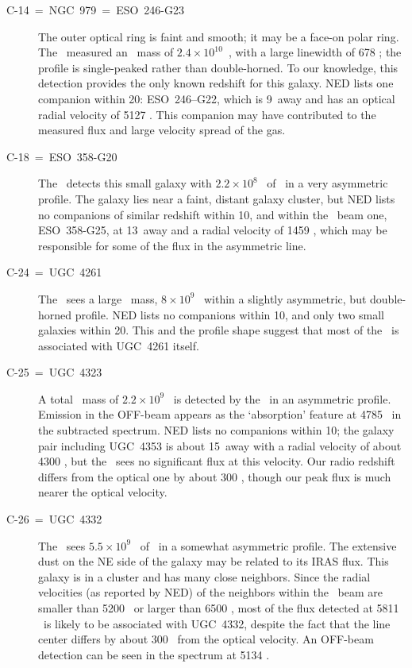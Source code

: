 \begin{description}
\item[C-14~=~NGC~979~=~ESO~246-G23] 
The outer optical ring is faint and smooth; it may be 
a face-on polar ring.  The \ measured 
an \HI\ mass of \hbox{$2.4 \times 10^{10}$ \MSUN}, with a large linewidth of 
678 \KMS; the profile is single-peaked rather than double-horned.  
To our knowledge, this detection provides the only known 
redshift for this galaxy.  
NED lists one companion within 20\AMIN: ESO~246--G22, which is 
9\AMIN\ away and has an optical radial velocity of 5127 \KMS.  This 
companion may have contributed to the measured flux and large velocity 
spread of the gas.

\item[C-18~=~ESO~358-G20] 
The \ detects this small galaxy with $2.2 \times 10^8$ \MSUN\ 
of \HI\ in a very asymmetric profile.  
The galaxy lies near a 
faint, distant galaxy cluster, but NED lists no companions 
of similar redshift within 10\AMIN, and within the \ beam one, 
ESO~358-G25, at 13\AMIN\ away and a radial velocity of 1459 \KMS, which may 
be responsible for some of the flux in the asymmetric line.  

\item[C-24~=~UGC~4261] 
The \ sees a large \HI\ mass, $8\times 10^9$
\MSUN\ within a slightly asymmetric, but double-horned profile.  
NED lists no companions within 10\AMIN, and only two small 
galaxies within 20\AMIN.  This and the profile shape  
suggest that most of the \HI\ is associated with UGC~4261 itself.  

\item[C-25~=~UGC~4323] 
A total \HI\ mass of $2.2 \times 10^9$ \MSUN\ is detected by the \ 
in an asymmetric profile.    
Emission in the OFF-beam appears as the `absorption' feature at 4785 \KMS\ 
in the subtracted spectrum.  
NED lists no companions within 10\AMIN; the galaxy pair 
including UGC~4353 is about 15\AMIN\ away with a radial velocity of about 
4300 \KMS, but the \GB140\ sees no significant flux at this velocity.  
Our radio redshift differs from the optical one by about 300 \KMS, 
though our peak flux is much nearer the optical velocity.  

\item[C-26~=~UGC~4332] 
The \GB140\ sees $5.5 \times 10^9$ \MSUN\ of \HI\ in a somewhat asymmetric 
profile.  The extensive dust on the NE side of the galaxy may be related 
to its IRAS flux.  This galaxy is in a cluster 
and has many close neighbors.   
Since the radial velocities (as reported by NED) of the neighbors within 
the \GB140\ beam 
are smaller than 5200 \KMS\ or larger than 6500 \KMS, most of the flux 
detected at 5811 \KMS\ is likely to be associated with UGC~4332, 
despite the fact that the line center differs by about 300 \KMS\ from the 
optical velocity.  An OFF-beam detection can be seen in the spectrum 
at 5134 \KMS.  


\end{description}
